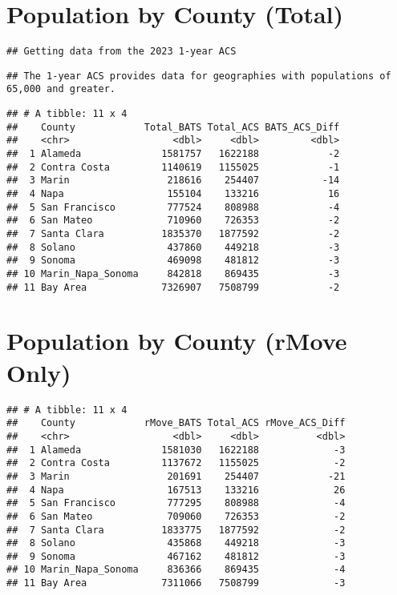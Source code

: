\documentclass[
]{article}
\begin{document}
\section{Population by County (Total)}\label{population-by-county-total}

\begin{verbatim}
## Getting data from the 2023 1-year ACS
\end{verbatim}

\begin{verbatim}
## The 1-year ACS provides data for geographies with populations of 65,000 and greater.
\end{verbatim}

\begin{verbatim}
## # A tibble: 11 x 4
##    County            Total_BATS Total_ACS BATS_ACS_Diff
##    <chr>                  <dbl>     <dbl>         <dbl>
##  1 Alameda              1581757   1622188            -2
##  2 Contra Costa         1140619   1155025            -1
##  3 Marin                 218616    254407           -14
##  4 Napa                  155104    133216            16
##  5 San Francisco         777524    808988            -4
##  6 San Mateo             710960    726353            -2
##  7 Santa Clara          1835370   1877592            -2
##  8 Solano                437860    449218            -3
##  9 Sonoma                469098    481812            -3
## 10 Marin_Napa_Sonoma     842818    869435            -3
## 11 Bay Area             7326907   7508799            -2
\end{verbatim}

\section{Population by County (rMove
Only)}\label{population-by-county-rmove-only}

\begin{verbatim}
## # A tibble: 11 x 4
##    County            rMove_BATS Total_ACS rMove_ACS_Diff
##    <chr>                  <dbl>     <dbl>          <dbl>
##  1 Alameda              1581030   1622188             -3
##  2 Contra Costa         1137672   1155025             -2
##  3 Marin                 201691    254407            -21
##  4 Napa                  167513    133216             26
##  5 San Francisco         777295    808988             -4
##  6 San Mateo             709060    726353             -2
##  7 Santa Clara          1833775   1877592             -2
##  8 Solano                435868    449218             -3
##  9 Sonoma                467162    481812             -3
## 10 Marin_Napa_Sonoma     836366    869435             -4
## 11 Bay Area             7311066   7508799             -3
\end{verbatim}
\end{document}
